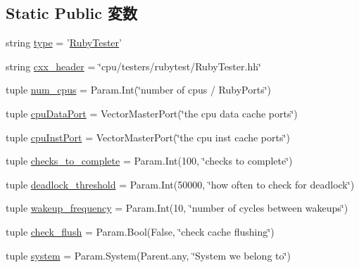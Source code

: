 \subsection*{Static Public 変数}
\begin{DoxyCompactItemize}
\item 
string \hyperlink{classRubyTester_1_1RubyTester_acce15679d830831b0bbe8ebc2a60b2ca}{type} = '\hyperlink{classRubyTester_1_1RubyTester}{RubyTester}'
\item 
string \hyperlink{classRubyTester_1_1RubyTester_a17da7064bc5c518791f0c891eff05fda}{cxx\_\-header} = \char`\"{}cpu/testers/rubytest/RubyTester.hh\char`\"{}
\item 
tuple \hyperlink{classRubyTester_1_1RubyTester_ab0bd6c2c9c8cc012f980111834ffc3a9}{num\_\-cpus} = Param.Int(\char`\"{}number of cpus / RubyPorts\char`\"{})
\item 
tuple \hyperlink{classRubyTester_1_1RubyTester_a70fb37d74d11e7e7c36433c9ca029bea}{cpuDataPort} = VectorMasterPort(\char`\"{}the cpu data cache ports\char`\"{})
\item 
tuple \hyperlink{classRubyTester_1_1RubyTester_ab3e342922861f8da4d310967fdbfbd72}{cpuInstPort} = VectorMasterPort(\char`\"{}the cpu inst cache ports\char`\"{})
\item 
tuple \hyperlink{classRubyTester_1_1RubyTester_a994a51defc7253aced0a10ea476ec95e}{checks\_\-to\_\-complete} = Param.Int(100, \char`\"{}checks to complete\char`\"{})
\item 
tuple \hyperlink{classRubyTester_1_1RubyTester_a642b24433a9b8d923a6fee4e6dce2bb0}{deadlock\_\-threshold} = Param.Int(50000, \char`\"{}how often to check for deadlock\char`\"{})
\item 
tuple \hyperlink{classRubyTester_1_1RubyTester_afa63d4d75218cbaf8106b3cff83ab404}{wakeup\_\-frequency} = Param.Int(10, \char`\"{}number of cycles between wakeups\char`\"{})
\item 
tuple \hyperlink{classRubyTester_1_1RubyTester_a400ee54e1eb918acf9125089d511859c}{check\_\-flush} = Param.Bool(False, \char`\"{}check cache flushing\char`\"{})
\item 
tuple \hyperlink{classRubyTester_1_1RubyTester_ab737471139f5a296e5b26e8a0e1b0744}{system} = Param.System(Parent.any, \char`\"{}System we belong to\char`\"{})
\end{DoxyCompactItemize}


